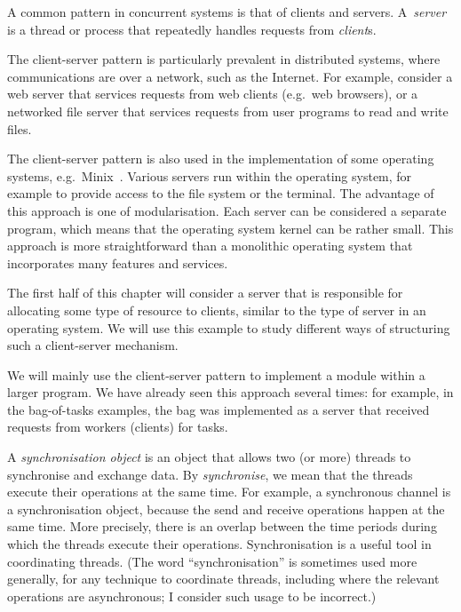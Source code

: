A common pattern in concurrent systems is that of clients and servers.
A~\emph{server} is a thread or process that repeatedly handles
requests from \emph{client}s.

The client-server pattern is particularly prevalent in distributed systems,
where communications are over a network, such as the Internet.  For example,
consider a web server that services requests from web clients (e.g.~web
browsers), or a networked file server that services requests from user
programs to read and write files.

The client-server pattern is also used in the implementation of some operating
systems, e.g.~Minix~\cite{minix}.  Various servers run within the operating
system, for example to provide access to the file system or the terminal.  The
advantage of this approach is one of modularisation.  Each server can be
considered a separate program, which means that the operating system kernel
can be rather small.  This approach is more straightforward than a monolithic
operating system that incorporates many features and services.

The first half of this chapter will consider a server that is responsible for
allocating some type of resource to clients, similar to the type of server in
an operating system.  We will use this example to study different ways of
structuring such a client-server mechanism.

We will mainly use the client-server pattern to implement a module within a
larger program.  We have already seen this
approach several times: for example, in the bag-of-tasks examples, the bag was
implemented as a server that received requests from workers (clients) for
tasks.
 
A \emph{synchronisation object} is an object
that allows two (or more) threads to synchronise and exchange data.
By \emph{synchronise}, we mean that the threads execute
their operations at the same time.  For example, a synchronous channel is a
synchronisation object, because the send and receive operations happen at the
same time.  More precisely, there is an overlap between the time periods during
which the threads execute their operations.  Synchronisation is a useful tool
in coordinating threads.  (The word ``synchronisation'' is sometimes used more
generally, for any technique to coordinate threads, including where the
relevant operations are asynchronous; I consider such usage to be incorrect.) 

